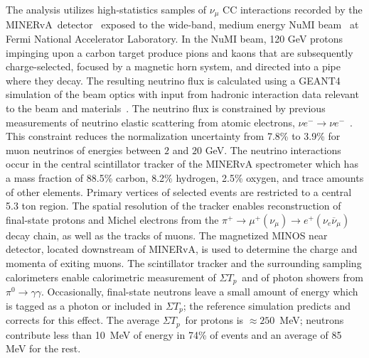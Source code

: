 \documentclass[aps,prl,twocolumn,showpacs,superscriptaddress, floatfix]{revtex4-2}  %
\newcommand{\minerva}{MINERvA}
\newcommand{\sumtp}{\ensuremath{\Sigma T_{p}}}
\begin{document}
The analysis utilizes high-statistics samples of $\nu_{\mu}$ CC interactions recorded by the \minerva\ detector~\cite{Aliaga:2013uqz} exposed to the wide-band, medium energy NuMI beam~\cite{Adamson:2015dkw} at Fermi National Accelerator Laboratory.  In the NuMI beam, 120 GeV protons impinging upon a carbon target produce pions and kaons that are subsequently charge-selected, focused by a magnetic horn system, and directed into a pipe where they decay.  The resulting neutrino flux is calculated using a GEANT4 simulation of the beam optics with input from hadronic interaction data relevant to the beam and materials~\cite{Aliaga:2016oaz}. The neutrino flux is constrained by previous measurements of neutrino elastic scattering from atomic electrons,
$\nu e^-\to\nu e^-$~\cite{Valencia:2019mkf}. This constraint reduces the normalization uncertainty from 7.8\% to 3.9\% for muon neutrinos of energies between $2$ and $20$ GeV.
%
The neutrino interactions occur in the central scintillator tracker of the MINERvA spectrometer
which has a mass fraction of 88.5\% carbon, 8.2\% hydrogen, 2.5\% oxygen, and trace amounts of other elements. Primary vertices of selected events are restricted to a central 5.3 ton region.  The spatial resolution of the tracker enables reconstruction of final-state protons and Michel electrons from the $\pi^+\to\mu^+(\nu_\mu) \to e^+ (\nu_e\overline{\nu}_\mu)$ decay chain, as well as the tracks of muons.  The magnetized MINOS near detector, located downstream of \minerva, is used to determine the charge and momenta of exiting muons.
The scintillator tracker and the surrounding sampling calorimeters enable calorimetric measurement of \sumtp\ and of photon showers from $\pi^0\to\gamma\gamma$.  Occasionally, final-state neutrons leave a small amount of energy which is tagged as a photon or included in \sumtp; the reference simulation predicts and corrects for this effect. 
The average \sumtp\ for protons is $\approx 250$~MeV;  neutrons contribute less than 10~MeV of energy in 74\% of events and an average of 85 MeV for the rest. 
\end{document}
